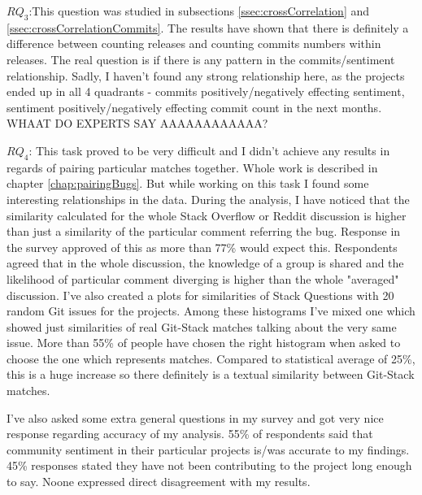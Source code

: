 \textbf{$RQ_{3}$}:This question was studied in subsections \ref{ssec:crossCorrelation} and \ref{ssec:crossCorrelationCommits}. The results have shown that there is definitely a difference between counting releases and counting commits numbers within releases. The real question is if there is any pattern in the commits/sentiment relationship. Sadly, I haven't found any strong relationship here, as the projects ended up in all 4 quadrants - commits positively/negatively effecting sentiment, sentiment positively/negatively effecting commit count in the next months. 
WHAAT DO EXPERTS SAY AAAAAAAAAAAA?

\textbf{$RQ_{4}$}: This task proved to be very difficult and I didn't achieve any results in regards of pairing particular matches together. Whole work is described in chapter \ref{chap:pairingBugs}. But while working on this task I found some interesting relationships in the data. During the analysis, I have noticed that the similarity calculated for the whole Stack Overflow or Reddit discussion is higher than just a similarity of the particular comment referring the bug. Response in the survey approved of this as more than 77\% would expect this. Respondents agreed that in the whole discussion, the knowledge of a group is shared and the likelihood of particular comment diverging is higher than the whole "averaged" discussion. I've also created a plots for similarities of Stack Questions with 20 random Git issues for the projects. Among these histograms I've mixed one which showed just similarities of real Git-Stack matches talking about the very same issue. More than 55\% of people have chosen the right histogram when asked to choose the one which represents matches. Compared to statistical average of 25\%, this is a huge increase so there definitely is a textual similarity between Git-Stack matches.


I've also asked some extra general questions in my survey and got very nice response regarding accuracy of my analysis. 55\% of respondents said that community sentiment in their particular projects is/was accurate to my findings. 45\% responses stated they have not been contributing to the project long enough to say. Noone expressed direct disagreement with my results.